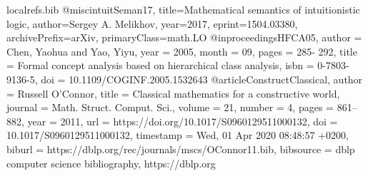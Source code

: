 \begin{filecontents}{localrefs.bib}
@misc{intuitSeman17,
      title={Mathematical semantics of intuitionistic logic}, 
      author={Sergey A. Melikhov},
      year={2017},
      eprint={1504.03380},
      archivePrefix={arXiv},
      primaryClass={math.LO}
}
@inproceedings{HFCA05,
author = {Chen, Yaohua and Yao, Yiyu},
year = {2005},
month = {09},
pages = {285- 292},
title = {Formal concept analysis based on hierarchical class analysis},
isbn = {0-7803-9136-5},
doi = {10.1109/COGINF.2005.1532643}
}
@article{ConstructClassical,
  author    = {Russell O'Connor},
  title     = {Classical mathematics for a constructive world},
  journal   = {Math. Struct. Comput. Sci.},
  volume    = {21},
  number    = {4},
  pages     = {861--882},
  year      = {2011},
  url       = {https://doi.org/10.1017/S0960129511000132},
  doi       = {10.1017/S0960129511000132},
  timestamp = {Wed, 01 Apr 2020 08:48:57 +0200},
  biburl    = {https://dblp.org/rec/journals/mscs/OConnor11.bib},
  bibsource = {dblp computer science bibliography, https://dblp.org}
}
\end{filecontents}

\documentclass[]{llncs}
%

\usepackage[table]{xcolor}
\usepackage{tikz-cd} 
\usepackage {pst-node}
\usepackage {latexsym}
\usepackage[all]{xy}
\usepackage{mathpartir}
\usepackage {stmaryrd}
\usepackage {amsmath,cancel}
\usepackage {amssymb}
\usepackage {floatflt}
\usepackage{tikzit}
\usepackage{bussProof}


